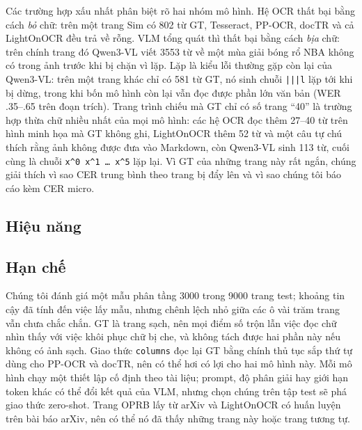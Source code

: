 \documentclass[10pt,a4paper]{article}
\begin{document}
Các trường hợp xấu nhất phân biệt rõ hai nhóm mô hình. Hệ OCR thất bại bằng cách \emph{bỏ} chữ: trên một trang
Sim có 802 từ GT, Tesseract, PP-OCR, docTR và cả LightOnOCR đều trả về rỗng. VLM tổng quát thì thất bại bằng
cách \emph{bịa} chữ: trên chính trang đó Qwen3-VL viết 3553 từ về một mùa giải bóng rổ NBA không có trong ảnh
trước khi bị chặn vì lặp. Lặp là kiểu lỗi thường gặp còn lại của Qwen3-VL: trên một trang khác chỉ có 581 từ GT,
nó sinh chuỗi \texttt{|||l} lặp tới khi bị dừng, trong khi bốn mô hình còn lại vẫn đọc được phần lớn văn bản
(WER .35--.65 trên đoạn trích). Trang trình chiếu mà GT chỉ có số trang ``40'' là trường hợp thừa chữ nhiều
nhất của mọi mô hình: các hệ OCR đọc thêm 27--40 từ trên hình minh họa mà GT không ghi, LightOnOCR thêm 52 từ và
một câu tự chú thích rằng ảnh không được đưa vào Markdown, còn Qwen3-VL sinh 113 từ, cuối cùng là chuỗi
\texttt{x\^{}0 x\^{}1 \ldots{} x\^{}5} lặp lại. Vì GT của những trang này rất ngắn, chúng giải thích vì sao
CER trung bình theo trang bị đẩy lên và vì sao chúng tôi báo cáo kèm CER micro.

\subsection{Hiệu năng}

\subsection{Hạn chế}
Chúng tôi đánh giá một mẫu phân tầng 3000 trong 9000 trang test; khoảng tin cậy đã tính đến việc lấy mẫu, nhưng
chênh lệch nhỏ giữa các ô vài trăm trang vẫn chưa chắc chắn. GT là trang sạch, nên mọi điểm số trộn lẫn việc đọc
chữ nhìn thấy với việc khôi phục chữ bị che, và không tách được hai phần này nếu không có ảnh sạch. Giao thức
\texttt{columns} đọc lại GT bằng chính thủ tục sắp thứ tự dùng cho PP-OCR và docTR, nên có thể hơi có lợi cho
hai mô hình này. Mỗi mô hình chạy một thiết lập cố định theo tài liệu; prompt, độ phân giải hay giới hạn token
khác có thể đổi kết quả của VLM, nhưng chọn chúng trên tập test sẽ phá giao thức zero-shot. Trang OPRB lấy từ
arXiv và LightOnOCR có huấn luyện trên bài báo arXiv, nên có thể nó đã thấy những trang này hoặc trang tương tự.
\end{document}
